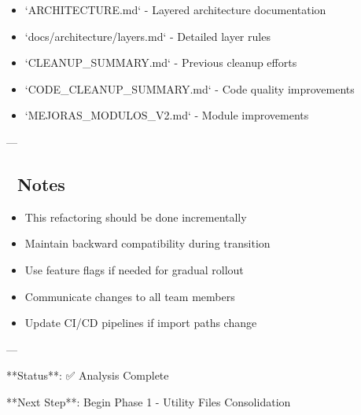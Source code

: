 \documentclass[11pt,a4paper]{article}
\begin{document}
\begin{itemize}
\item `ARCHITECTURE.md` - Layered architecture documentation
\end{itemize}

\begin{itemize}
\item `docs/architecture/layers.md` - Detailed layer rules
\end{itemize}

\begin{itemize}
\item `CLEANUP_SUMMARY.md` - Previous cleanup efforts
\end{itemize}

\begin{itemize}
\item `CODE_CLEANUP_SUMMARY.md` - Code quality improvements
\end{itemize}

\begin{itemize}
\item `MEJORAS_MODULOS_V2.md` - Module improvements
\end{itemize}

---

\subsection{📝 Notes}

\begin{itemize}
\item This refactoring should be done incrementally
\end{itemize}

\begin{itemize}
\item Maintain backward compatibility during transition
\end{itemize}

\begin{itemize}
\item Use feature flags if needed for gradual rollout
\end{itemize}

\begin{itemize}
\item Communicate changes to all team members
\end{itemize}

\begin{itemize}
\item Update CI/CD pipelines if import paths change
\end{itemize}

---

**Status**: ✅ Analysis Complete  

**Next Step**: Begin Phase 1 - Utility Files Consolidation
\end{document}
